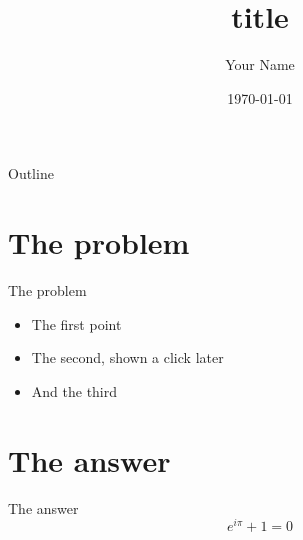 \documentclass{beamer}
\title{{{title}}}
\author{Your Name}
\date{\today}
\begin{document}
\begin{frame}
  \titlepage
\end{frame}

\begin{frame}{Outline}
  \tableofcontents
\end{frame}

\section{The problem}

\begin{frame}{The problem}
  \begin{itemize}
    \item The first point
    \item The second, shown a click later \pause
    \item And the third
  \end{itemize}
\end{frame}

\section{The answer}

\begin{frame}{The answer}
  \begin{equation*}
    e^{i\pi} + 1 = 0
  \end{equation*}
\end{frame}
\end{document}
